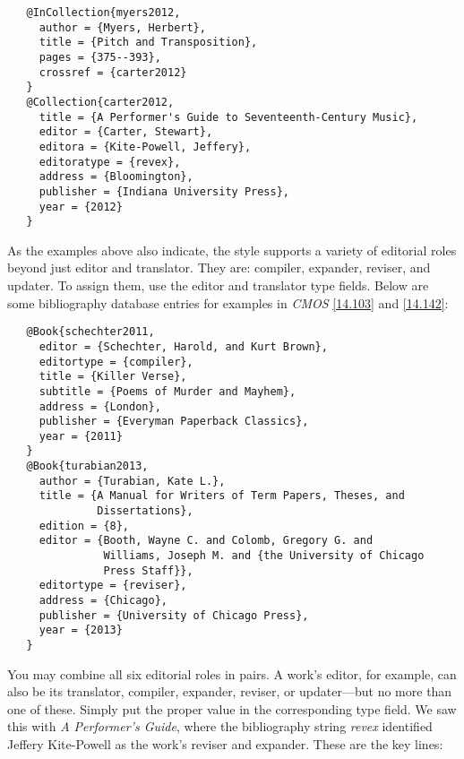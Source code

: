\documentclass[11pt,letterpaper,oneside]{article}
\begin{document}
\begin{verbatim}
   @InCollection{myers2012,
     author = {Myers, Herbert},
     title = {Pitch and Transposition},
     pages = {375--393},
     crossref = {carter2012}
   }
   @Collection{carter2012,
     title = {A Performer's Guide to Seventeenth-Century Music},
     editor = {Carter, Stewart},
     editora = {Kite-Powell, Jeffery},
     editoratype = {revex},
     address = {Bloomington},
     publisher = {Indiana University Press},
     year = {2012}
   }
\end{verbatim}

\begin{bibonly}
\nocite{myers2012,carter2012}
\end{bibonly}

As the examples above also indicate, the style supports a variety of
editorial roles beyond just editor and translator. They are: compiler,
expander, reviser, and updater. To assign them, use the editor and
translator type fields. Below are some bibliography database entries
for examples in \textit{CMOS} \ref{14.103} and \ref{14.142}:

\begin{verbatim}
   @Book{schechter2011,
     editor = {Schechter, Harold, and Kurt Brown},
     editortype = {compiler},
     title = {Killer Verse},
     subtitle = {Poems of Murder and Mayhem},
     address = {London},
     publisher = {Everyman Paperback Classics},
     year = {2011}
   }
   @Book{turabian2013,
     author = {Turabian, Kate L.},
     title = {A Manual for Writers of Term Papers, Theses, and
              Dissertations},
     edition = {8},
     editor = {Booth, Wayne C. and Colomb, Gregory G. and
               Williams, Joseph M. and {the University of Chicago
               Press Staff}},
     editortype = {reviser},
     address = {Chicago},
     publisher = {University of Chicago Press},
     year = {2013}
   }
\end{verbatim}

\begin{citebib}
\item \cite{schechter2011}
\item \cite{turabian2013}
\end{citebib}

You may combine all six editorial roles in pairs. A work's editor, for
example, can also be its translator, compiler, expander, reviser, or
updater---but no more than one of these. Simply put the proper value
in the corresponding type field. We saw this with \textit{A
Performer's Guide}, where the bibliography string \textit{revex}
identified Jeffery Kite-Powell as the work's reviser and expander.
These are the key lines:
\end{document}

